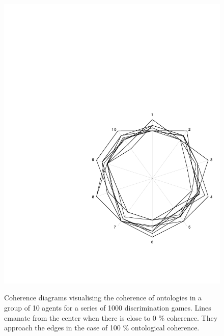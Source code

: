 \begin{figure}[h]
{\includegraphics[width=.32\textwidth]{chap7/figs/com10.pdf}}

\caption{\label{cohweb}Coherence diagrams visualising
the coherence of ontologies in a group of 10 agents for
a series of 1000 discrimination games. Lines emanate 
from the center when there is close to 0 \% coherence. They approach the
edges in the case of 100 \% ontological coherence.}
\end{figure}

